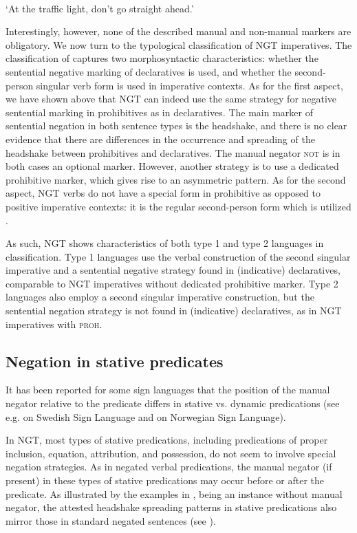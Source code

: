 \documentclass[output=paper,colorlinks,citecolor=brown]{langscibook}
\begin{document}
\ea\label{ex:ngt:traffic}
      \\ `At the traffic light, don't go straight ahead.'  \citep[20]{Spruijt2019}
\z

Interestingly, however, none of the described manual and non-manual markers are obligatory. 
We now turn to the typological classification of NGT imperatives. The classification of \citet{AuweraEtAl2013} captures two morphosyntactic characteristics: whether the sentential negative marking of declaratives is used, and whether the second-person singular verb form is used in imperative contexts. As for the first aspect, we have shown above that NGT can indeed use the same strategy for negative sentential marking in prohibitives as in declaratives. The main marker of sentential negation in both sentence types is the headshake, and there is no clear evidence that there are differences in the occurrence and spreading of the headshake between prohibitives and declaratives. The manual negator \textsc{not} is in both cases an optional marker. However, another strategy is to use a dedicated prohibitive marker, which gives rise to an asymmetric pattern. As for the second aspect, NGT verbs do not have a special form in prohibitive as opposed to positive imperative contexts: it is the regular second-person form which is utilized \citep[see][]{Spruijt2019}. 

As such, NGT shows characteristics of both type 1 and type 2 languages in  classification. Type 1 languages use the verbal construction of the second singular imperative and a sentential negative strategy found in (indicative) declaratives, comparable to NGT imperatives without dedicated prohibitive marker. Type 2 languages also employ a second singular imperative construction, but the sentential negation strategy is not found in (indicative) declaratives, as in NGT imperatives with \textsc{proh}.

\subsection{Negation in stative predicates} 
It has been reported for some sign languages that the position of the manual negator relative to the predicate differs in stative vs. dynamic predications (see e.g. \citeauthor{Bergman1995} \citeyear{Bergman1995} on Swedish Sign Language and \citeauthor{Vogt-svendsen2000} \citeyear{Vogt-svendsen2000} on Norwegian Sign Language). 

In NGT, most types of stative predications, including predications of proper inclusion, equation, attribution, and possession, do not seem to involve special negation strategies. As in negated verbal predications, the manual negator (if present) in these types of stative predications may occur before  or after  the predicate. As illustrated by the examples in ,  being an instance without manual negator, the attested headshake spreading patterns in stative predications also mirror those in standard negated sentences (see ).
\end{document}
